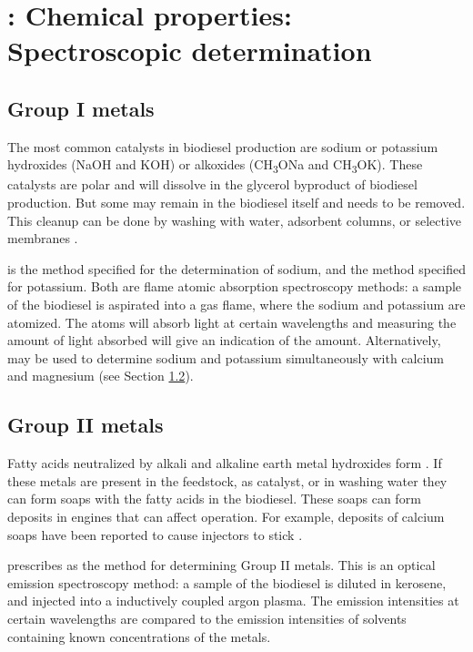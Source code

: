 \section{\texorpdfstring{}{SANS 1935}: Chemical properties: Spectroscopic determination}

\subsection{Group I metals}

The most common catalysts in biodiesel production are sodium or potassium
hydroxides (NaOH and KOH) or alkoxides (CH\textsubscript{3}ONa and
CH\textsubscript{3}OK). These catalysts are polar and will dissolve in the
glycerol byproduct of biodiesel production. But some may remain in the biodiesel
itself and needs to be removed. This cleanup can be done by washing with water,
adsorbent columns, or selective membranes \autocite{Atadashi2011}.

 is the method specified for the determination of sodium, and
 the method specified for potassium. Both are flame atomic
absorption spectroscopy methods: a sample of the biodiesel is aspirated into a
gas flame, where the sodium and potassium are atomized. The atoms will absorb
light at certain wavelengths and measuring the amount of light absorbed will
give an indication of the amount. Alternatively,  may be used to
determine sodium and potassium simultaneously with calcium and magnesium (see
Section \ref{sec:GroupIIMetals}).

\subsection{Group II metals}
\label{sec:GroupIIMetals}

Fatty acids neutralized by alkali and alkaline earth metal hydroxides form
. If these metals are present in the feedstock, as catalyst, or
in washing water they can form soaps with the fatty acids in the biodiesel.
These soaps can form deposits in engines that can affect operation. For example,
deposits of calcium soaps have been reported to cause injectors to stick
\autocite{Pischinger2000}.

 prescribes  as the method for determining Group II
metals. This is an optical emission spectroscopy method: a sample of the
biodiesel is diluted in kerosene, and injected into a inductively coupled argon
plasma. The emission intensities at certain wavelengths are compared to the
emission intensities of solvents containing known concentrations of the metals.

